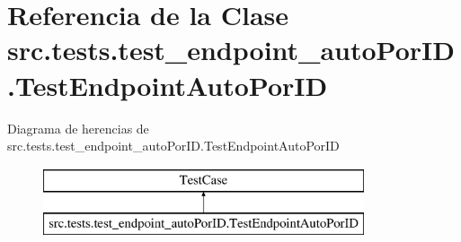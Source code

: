 \hypertarget{classsrc_1_1tests_1_1test__endpoint__auto_por_i_d_1_1_test_endpoint_auto_por_i_d}{\section{Referencia de la Clase src.\-tests.\-test\-\_\-endpoint\-\_\-auto\-Por\-I\-D.\-Test\-Endpoint\-Auto\-Por\-I\-D}
\label{classsrc_1_1tests_1_1test__endpoint__auto_por_i_d_1_1_test_endpoint_auto_por_i_d}
}
Diagrama de herencias de src.\-tests.\-test\-\_\-endpoint\-\_\-auto\-Por\-I\-D.\-Test\-Endpoint\-Auto\-Por\-I\-D\begin{figure}[H]
\begin{center}
\leavevmode
\includegraphics[height=2.000000cm]{classsrc_1_1tests_1_1test__endpoint__auto_por_i_d_1_1_test_endpoint_auto_por_i_d}
\end{center}
\end{figure}
